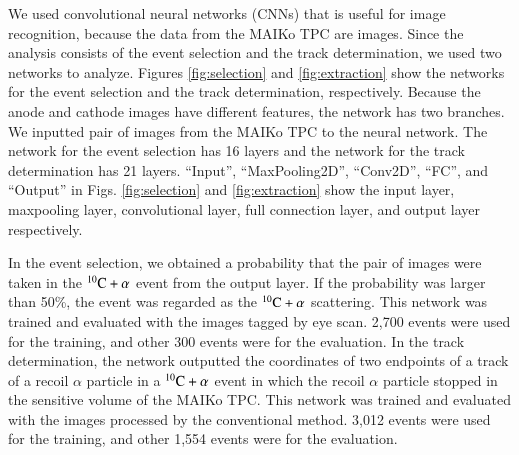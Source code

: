 \documentclass{jps-cp}
\begin{document}
We used convolutional neural networks (CNNs) that is useful for image recognition,
because the data from the MAIKo TPC are images.
Since the analysis consists of the event selection and the track determination,
we used two networks to analyze.
Figures \ref{fig:selection} and \ref{fig:extraction} show
the networks for the event selection and the track determination, respectively.
Because the anode and cathode images have different features,
the network has two branches.
We inputted pair of images from the MAIKo TPC to the neural network.
The network for the event selection has 16 layers and the network for the track determination has 21 layers.
``Input'', ``MaxPooling2D'', ``Conv2D'', ``FC'', and ``Output'' in Figs. \ref{fig:selection} and \ref{fig:extraction} show
the input layer, maxpooling layer, convolutional layer, full connection layer, and output layer respectively.

In the event selection, we obtained a probability that the pair of images were taken
in the ${}^{10}\rm{C}+\alpha$ event from the output layer.
If the probability was larger than 50\%, the event was regarded as the ${}^{10}\rm{C}+\alpha$ scattering.
This network was trained and evaluated with the images tagged by eye scan.
2,700 events were used for the training, and other 300 events were for the evaluation.
In the track determination, the network outputted the coordinates of two endpoints of
a track of a recoil $\alpha$ particle in a ${}^{10}\rm{C}+\alpha$ event in which the recoil $\alpha$ particle stopped
in the sensitive volume of the MAIKo TPC.
This network was trained and evaluated with the images processed by the conventional method.
3,012 events were used for the training, and other 1,554 events were for the evaluation.
\end{document}
